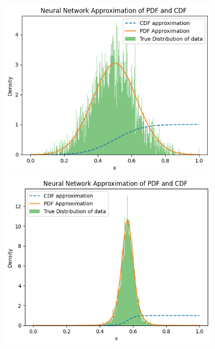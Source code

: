 \begin{figure}
        \begin{minipage}{0.45\textwidth}
            \centering
            \includegraphics[width=\textwidth]{5ResultsDiscussion/pictures/MarginalTest/NormalHistogram.png}
        \end{minipage}
    \hfill
        \begin{minipage}{0.45\textwidth}
            \centering
            \includegraphics[width=\textwidth]{5ResultsDiscussion/pictures/MarginalTest/StudentsHistogram.png}
        \end{minipage}


\end{figure}
